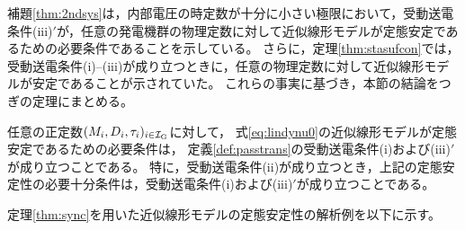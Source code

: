 \documentclass[tombow,dvipdfmx]{corona-a5-1.1}
\begin{document}
補題\ref{thm:2ndsys}は，内部電圧の時定数が十分に小さい極限において，受動送電条件(iii)$'$が，任意の発電機群の物理定数に対して近似線形モデルが定態安定であるための必要条件であることを示している。
さらに，定理\ref{thm:stasufcon}では，受動送電条件(i)--(iii)が成り立つときに，任意の物理定数に対して近似線形モデルが安定であることが示されていた。
これらの事実に基づき，本節の結論をつぎの定理にまとめる。


\begin{定理}[近似線形モデルの定態安定性]\label{thm:sync}
任意の正定数$(M_i,D_i,\tau_i)_{i \in \mathcal{I}_{\rm G}}$に対して，
式\ref{eq:lindynu0}の近似線形モデルが定態安定であるための必要条件は，
定義\ref{def:passtrans}の受動送電条件(i)および(iii)$'$が成り立つことである。
特に，受動送電条件(ii)が成り立つとき，上記の定態安定性の必要十分条件は，受動送電条件(i)および(iii)$'$が成り立つことである。
\end{定理}


定理\ref{thm:sync}を用いた近似線形モデルの定態安定性の解析例を以下に示す。
\end{document}
